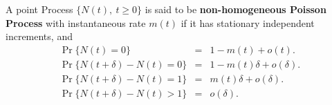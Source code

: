 \documentclass[a4paper,english,10pt]{article}
\begin{document}
\begin{defn}\label{defn:NonHomogeneousPoisson} A point Process $\{N(t),~t\geqslant 0\}$ is said to be \textbf{non-homogeneous Poisson Process} with instantaneous rate $m(t)$ if it has stationary independent increments, and 
	\begin{eqnarray*}\label{eq:NonHomogeneousPoisson}
		\Pr\{N(t)=0\}&=&1-m(t)+o(t). \\
		\Pr\{N(t+\delta)-N(t)=0\} &=& 1-m(t)\delta+o(\delta). \\
		\Pr\{N(t+\delta)-N(t)=1\} &=& m(t)\delta+o(\delta). \\
		\Pr\{N(t+\delta)-N(t)>1\} &=& o(\delta). \\
	\end{eqnarray*}
\end{defn}
\end{document}
